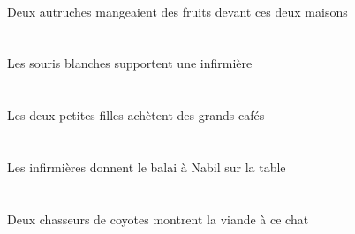 \begin{exe}
\DEMDuOblG{}   \maisonDDuOblG{}   \DEVANTG{}   \INDDuErgG{}   \autrucheBDuErgG{}   \INDPlAbsG{}   \fruitAPlAbsG{}  \mangerVtPstAPlG{}\\
Deux autruches mangeaient des fruits devant ces deux maisons
\ex\glll
\DEFPlErg{}   \blancBPl{}   \sourisBPlErg{}   \INDSgAbs{}   \infirmiereASgAbs{}  \supporterVtPrsASg{}\\
\DEFPlErgP{}   \blancBPlP{}   \sourisBPlErgP{}   \INDSgAbsP{}   \infirmiereASgAbsP{}  \supporterVtPrsASgP{}\\
\DEFPlErgG{}   \blancBPlG{}   \sourisBPlErgG{}   \INDSgAbsG{}   \infirmiereASgAbsG{}  \supporterVtPrsASgG{}\\
Les souris blanches supportent une infirmière
\ex\glll
\DEFDuErg{}   \petitCDu{}   \filleCDuErg{}   \INDPlAbs{}   \grandCPl{}   \cafeCPlAbs{}  \acheterVtPrsCPl{}\\
\DEFDuErgP{}   \petitCDuP{}   \filleCDuErgP{}   \INDPlAbsP{}   \grandCPlP{}   \cafeCPlAbsP{}  \acheterVtPrsCPlP{}\\
\DEFDuErgG{}   \petitCDuG{}   \filleCDuErgG{}   \INDPlAbsG{}   \grandCPlG{}   \cafeCPlAbsG{}  \acheterVtPrsCPlG{}\\
Les deux petites filles achètent des grands cafés
\ex\glll
\DEFSgObl{}   \tableDSgObl{}   \SUR{}   \DEFPlErg{}   \infirmiereAPlErg{}    \INDSgDat{}   \NabilDSgDat{}   \DEFSgAbs{}   \balaiASgAbs{}  \donnerVdPrsASg{}\\
\DEFSgOblP{}   \tableDSgOblP{}   \SURP{}   \DEFPlErgP{}   \infirmiereAPlErgP{}    \INDSgDatP{}   \NabilDSgDatP{}   \DEFSgAbsP{}   \balaiASgAbsP{}  \donnerVdPrsASgP{}\\
\DEFSgOblG{}   \tableDSgOblG{}   \SURG{}   \DEFPlErgG{}   \infirmiereAPlErgG{}    \INDSgDatG{}   \NabilDSgDatG{}   \DEFSgAbsG{}   \balaiASgAbsG{}  \donnerVdPrsASgG{}\\
Les infirmières donnent le balai à Nabil sur la table
\ex\glll
\INDDuErg{}    \INDPlObl{}   \coyoteCPlObl{}   \DE{}   \chasseurCDuErg{}    \DEMSgDat{}   \chatDSgDat{}   \DEFSgAbs{}   \viandeASgAbs{}  \montrerVdPrsASg{}\\
\INDDuErgP{}    \INDPlOblP{}   \coyoteCPlOblP{}   \DEP{}   \chasseurCDuErgP{}    \DEMSgDatP{}   \chatDSgDatP{}   \DEFSgAbsP{}   \viandeASgAbsP{}  \montrerVdPrsASgP{}\\
\INDDuErgG{}    \INDPlOblG{}   \coyoteCPlOblG{}   \DEG{}   \chasseurCDuErgG{}    \DEMSgDatG{}   \chatDSgDatG{}   \DEFSgAbsG{}   \viandeASgAbsG{}  \montrerVdPrsASgG{}\\
Deux chasseurs de coyotes montrent la viande à ce chat

\end{exe}
